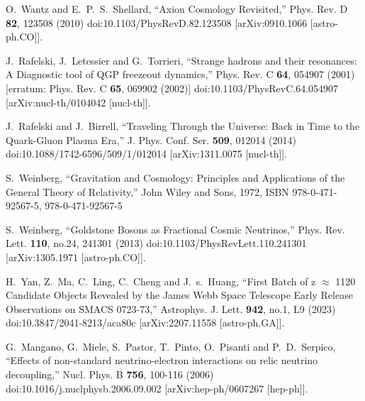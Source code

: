 \begin{thebibliography}{99}
O.~Wantz and E.~P.~S.~Shellard,
``Axion Cosmology Revisited,''
Phys. Rev. D \textbf{82}, 123508 (2010)
doi:10.1103/PhysRevD.82.123508
[arXiv:0910.1066 [astro-ph.CO]].

J.~Rafelski, J.~Letessier and G.~Torrieri,
``Strange hadrons and their resonances: A Diagnostic tool of QGP freezeout dynamics,''
Phys. Rev. C \textbf{64}, 054907 (2001)
[erratum: Phys. Rev. C \textbf{65}, 069902 (2002)]
doi:10.1103/PhysRevC.64.054907
[arXiv:nucl-th/0104042 [nucl-th]].

J.~Rafelski and J.~Birrell,
``Traveling Through the Universe: Back in Time to the Quark-Gluon Plasma Era,''
J. Phys. Conf. Ser. \textbf{509}, 012014 (2014)
doi:10.1088/1742-6596/509/1/012014
[arXiv:1311.0075 [nucl-th]].

S.~Weinberg,
``Gravitation and Cosmology: Principles and Applications of the General Theory of Relativity,''
John Wiley and Sons, 1972,
ISBN 978-0-471-92567-5, 978-0-471-92567-5

S.~Weinberg,
``Goldstone Bosons as Fractional Cosmic Neutrinos,''
Phys. Rev. Lett. \textbf{110}, no.24, 241301 (2013)
doi:10.1103/PhysRevLett.110.241301
[arXiv:1305.1971 [astro-ph.CO]].

H.~Yan, Z.~Ma, C.~Ling, C.~Cheng and J.~s.~Huang,
``First Batch of z \ensuremath{\approx} 11\textendash{}20 Candidate Objects Revealed by the James Webb Space Telescope Early Release Observations on SMACS 0723-73,''
Astrophys. J. Lett. \textbf{942}, no.1, L9 (2023)
doi:10.3847/2041-8213/aca80c
[arXiv:2207.11558 [astro-ph.GA]].

G.~Mangano, G.~Miele, S.~Pastor, T.~Pinto, O.~Pisanti and P.~D.~Serpico,
``Effects of non-standard neutrino-electron interactions on relic neutrino decoupling,''
Nucl. Phys. B \textbf{756}, 100-116 (2006)
doi:10.1016/j.nuclphysb.2006.09.002
[arXiv:hep-ph/0607267 [hep-ph]].


\end{thebibliography}

